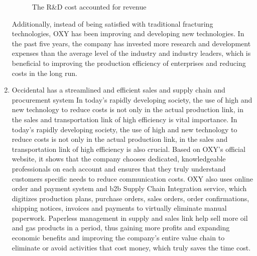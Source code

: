 \documentclass[
	a4paper, %
	12pt,%
]{CSSullivanBusinessReport}
\begin{document}
\begin{fullwidth}
\begin{enumerate}
\begin{figure}[h]
        \caption{The R&D cost accounted for revenue}
        \label{rd cost}
    \end{figure}
    Additionally, instead of being satisfied with traditional fracturing technologies, OXY has been improving and developing new technologies. In the past five years, the company has invested more research and development expenses than the average level of the industry and industry leaders, which is beneficial to improving the production efficiency of enterprises and reducing costs in the long run.
    \item Occidental has a streamlined and efficient sales and supply chain and procurement system
    In today's rapidly developing society, the use of high and new technology to reduce costs is not only in the actual production link, in the sales and transportation link of high efficiency is vital importance. In today's rapidly developing society, the use of high and new technology to reduce costs is not only in the actual production link, in the sales and transportation link of high efficiency is also crucial. Based on OXY’s official website, it shows that the company chooses dedicated, knowledgeable professionals on each account and ensures that they truly understand customers specific needs to reduce communication costs. OXY also uses online order and payment system and b2b Supply Chain Integration service, which digitizes production plans, purchase orders, sales orders, order confirmations, shipping notices, invoices and payments to virtually eliminate manual paperwork. Paperless management in supply and sales link help sell more oil and gas products in a period, thus gaining more profits and expanding economic benefits and improving the company's entire value chain to eliminate or avoid activities that cost money, which truly saves the time cost.
\end{enumerate}

\end{fullwidth}
\end{document}
